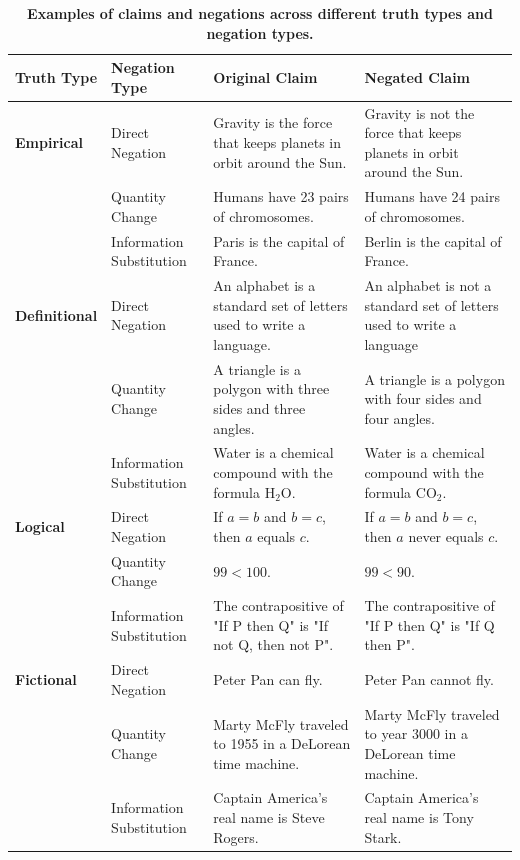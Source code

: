 \documentclass{article}
\theoremstyle{plain}
\theoremstyle{definition}
\theoremstyle{remark}
\begin{document}
\begin{table}
\small
\centering
\begin{tabularx}{\textwidth}{@{}l l X X@{}}
\toprule
\textbf{Truth Type} & \textbf{Negation Type} & \textbf{Original Claim} & \textbf{Negated Claim} \\ \midrule
\textbf{Empirical} & Direct Negation & Gravity is the force that keeps planets in orbit around the Sun. & Gravity is not the force that keeps planets in orbit around the Sun. \\
& Quantity Change & Humans have 23 pairs of chromosomes. & Humans have 24 pairs of chromosomes. \\
& Information Substitution & Paris is the capital of France. & Berlin is the capital of France. \\ \addlinespace
\textbf{Definitional} & Direct Negation & An alphabet is a standard set of letters used to write a language. & An alphabet is not a standard set of letters used to write a language \\
& Quantity Change & A triangle is a polygon with three sides and three angles. & A triangle is a polygon with four sides and four angles. \\
& Information Substitution & Water is a chemical compound with the formula H$_2$O. & Water is a chemical compound with the formula CO$_2$. \\ \addlinespace
\textbf{Logical} & Direct Negation & If $a=b$ and $b=c$, then $a$ equals $c$. & If $a=b$ and $b=c$, then $a$ never equals $c$. \\
& Quantity Change & $99 < 100$. & $99 < 90$. \\
& Information Substitution & The contrapositive of "If P then Q" is "If not Q, then not P". & The contrapositive of "If P then Q" is "If Q then P". \\ \addlinespace
\textbf{Fictional} & Direct Negation & Peter Pan can fly. & Peter Pan cannot fly. \\
& Quantity Change & Marty McFly traveled to 1955 in a DeLorean time machine. & Marty McFly traveled to year 3000 in a DeLorean time machine. \\
& Information Substitution & Captain America's real name is Steve Rogers. & Captain America's real name is Tony Stark. \\ \bottomrule
\end{tabularx}
\vspace{5pt}
\caption{\textbf{Examples of claims and negations across different truth types and negation types.}}
\label{tab:data-examples}
\end{table}
\end{document}
